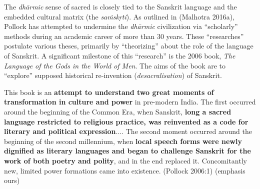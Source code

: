 The \textit{dhārmic} sense of sacred is closely tied to the Sanskrit language and the embedded cultural matrix (the \textit{saṁskṛti}). As outlined in (Malhotra 2016a), Pollock has attempted to undermine the \textit{dhārmic} civilization via “scholarly” methods during an academic career of more than 30 years. These “researches” postulate various theses, primarily by “theorizing” about the role of the language of Sanskrit. A significant milestone of this “research” is the 2006 book, \textit{The Language of the Gods in the World of Men}. The aims of the book are to “explore” supposed historical re-invention (\textit{desacralisation}) of Sanskrit.

\begin{myquote}
This book is an \textbf{attempt to understand two great moments of transformation in culture and power} in pre-modern India. The first occurred around the beginning of the Common Era, when Sanskrit, \textbf{long a sacred language restricted to religious practice, was reinvented as a code for literary and political expression}.... The second moment occurred around the beginning of the second millennium, when \textbf{local speech forms were newly dignified as literary languages and began to challenge Sanskrit for the work of both poetry and polity}, and in the end replaced it. Concomitantly new, limited power formations came into existence. \hfill (Pollock 2006:1) (emphasis ours)
\end{myquote}


